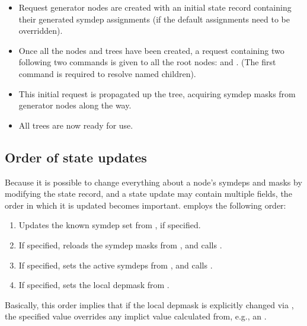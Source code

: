   \begin{itemize}
  
  \item Request generator nodes are created with an initial state record
    containing their generated symdep assignments (if the default assignments
    need to be overridden).
    
  \item Once all the nodes and trees have been created, a request containing
    two following two commands is given to all the root nodes:
     and . (The first command is
    required to resolve named children).
    
  \item This initial request is propagated up the tree, acquiring symdep masks
    from generator nodes along the way. 
    
  \item All trees are now ready for use.
  
  \end{itemize}

\subsection{Order of state updates}

  Because it is possible to change everything about a node's symdeps and masks
  by modifying the state record, and a state update may contain multiple
  fields, the order in which it is updated becomes important.
   employs the following order:

  \begin{enumerate}
  
  \item Updates the known symdep set from , if specified.
  
  \item If specified, reloads the symdep masks from , and
    calls .
    
  \item If specified, sets the active symdeps from , and
    calls .
    
  \item If specified, sets the local depmask from .
  
  \end{enumerate}
  
  Basically, this order implies that if the local depmask is explicitly changed
  via , the specified value overrides any implict value
  calculated from, e.g., an .
  
